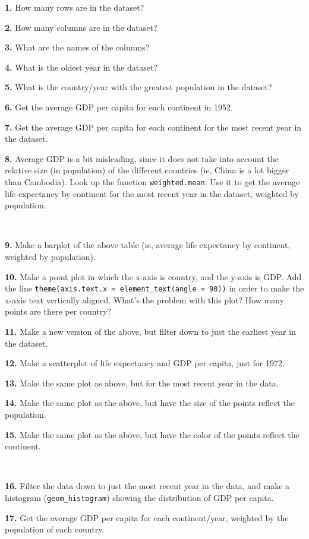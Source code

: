 \documentclass[
]{book}
\begin{document}
\textbf{1.} How many rows are in the dataset?

\textbf{2.} How many columns are in the dataset?

\textbf{3.} What are the names of the columns?

\textbf{4.} What is the oldest year in the dataset?

\textbf{5.} What is the country/year with the greatest population in the dataset?

\textbf{6.} Get the average GDP per capita for each continent in 1952.

\textbf{7.} Get the average GDP per capita for each continent for the most recent year in the dataset.

\textbf{8.} Average GDP is a bit misleading, since it does not take into account the relative size (in population) of the different countries (ie, China is a lot bigger than Cambodia). Look up the function \texttt{weighted.mean}. Use it to get the average life expectancy by continent for the most recent year in the dataset, weighted by population.

~

\textbf{9.} Make a barplot of the above table (ie, average life expectancy by continent, weighted by population).

\textbf{10.} Make a point plot in which the x-axis is country, and the y-axis is GDP. Add the line \texttt{theme(axis.text.x\ =\ element\_text(angle\ =\ 90))} in order to make the x-axis text vertically aligned. What's the problem with this plot? How many points are there per country?

\textbf{11.} Make a new version of the above, but filter down to just the earliest year in the dataset.

\textbf{12.} Make a scatterplot of life expectancy and GDP per capita, just for 1972.

\textbf{13.} Make the same plot as above, but for the most recent year in the data.

\textbf{14.} Make the same plot as the above, but have the size of the points reflect the population.

\textbf{15.} Make the same plot as the above, but have the color of the points reflect the continent.

~

\textbf{16.} Filter the data down to just the most recent year in the data, and make a histogram (\texttt{geom\_histogram}) showing the distribution of GDP per capita.

\textbf{17.} Get the average GDP per capita for each continent/year, weighted by the population of each country.
\end{document}
